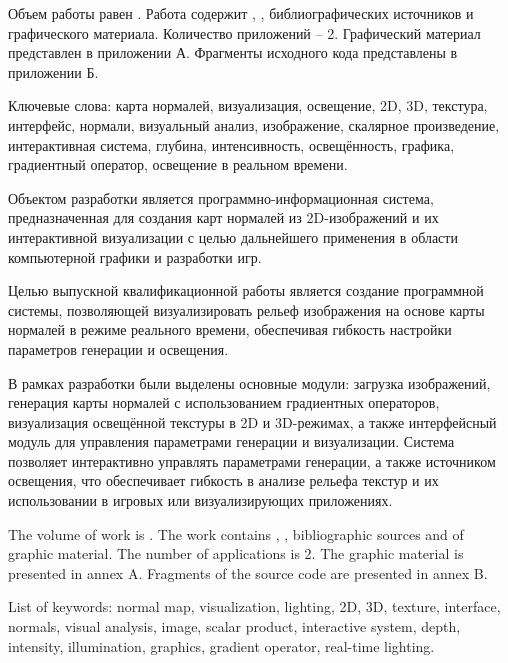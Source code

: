 
Объем работы равен . Работа содержит , ,  библиографических источников и  графического материала. Количество приложений – 2. Графический материал представлен в приложении А. Фрагменты исходного кода представлены в приложении Б.

Ключевые слова: карта нормалей, визуализация, освещение, 2D, 3D, текстура, интерфейс, нормали, визуальный анализ, изображение, скалярное произведение, интерактивная система, глубина, интенсивность, освещённость, графика, градиентный оператор, освещение в реальном времени.

Объектом разработки является программно-информационная система, предназначенная для создания карт нормалей из 2D-изображений и их интерактивной визуализации с целью дальнейшего применения в области компьютерной графики и разработки игр.

Целью выпускной квалификационной работы является создание программной системы, позволяющей визуализировать рельеф изображения на основе карты нормалей в режиме реального времени, обеспечивая гибкость настройки параметров генерации и освещения.

В рамках разработки были выделены основные модули: загрузка изображений, генерация карты нормалей с использованием градиентных операторов, визуализация освещённой текстуры в 2D и 3D-режимах, а также интерфейсный модуль для управления параметрами генерации и визуализации. Система позволяет интерактивно управлять параметрами генерации, а также источником освещения, что обеспечивает гибкость в анализе рельефа текстур и их использовании в игровых или визуализирующих приложениях.

  
The volume of work is . The work contains , ,  bibliographic sources and  of graphic material. The number of applications is 2. The graphic material is presented in annex A. Fragments of the source code are presented in annex B.

List of keywords: normal map, visualization, lighting, 2D, 3D, texture, interface, normals, visual analysis, image, scalar product, interactive system, depth, intensity, illumination, graphics, gradient operator, real-time lighting.

